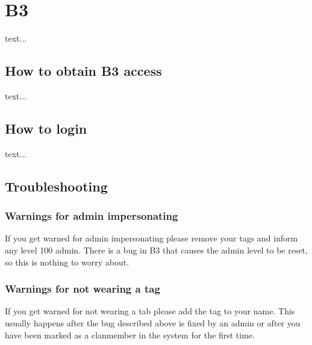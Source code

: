 \chapter{B3}
text...

\section{How to obtain B3 access}
\label{b3:obtain}
text...

\section{How to login}
\label{b3:login}
text...

\section{Troubleshooting}
\label{b3:troubleshooting}

\subsection{Warnings for admin impersonating}
If you get warned for admin impersonating please remove your tags and inform any level 100 admin. There is a bug in B3 that causes the admin level to be reset, so this is nothing to worry about.

\subsection{Warnings for not wearing a tag}
If you get warned for not wearing a tab please add the tag to your name. This usually happens after the bug described above is fixed by an admin or after you have been marked as a clanmember in the system for the first time.